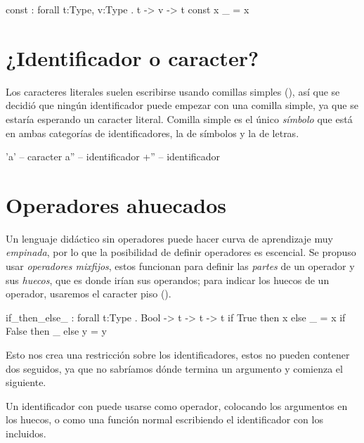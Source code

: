 {\begin{designfr}
\begin{anglercode}
const : forall t:Type, v:Type . t -> v -> t
const x _ = x
\end{anglercode}
\end{designfr}

\section{¿Identificador o caracter?}

\begin{designfr}
Los caracteres literales suelen escribirse usando comillas simples (), así que se decidió que ningún identificador puede empezar con una comilla simple, ya que se estaría esperando un caracter literal. Comilla simple es el único \emph{símbolo} que está en ambas categorías de identificadores, la de símbolos y la de letras.

\begin{anglercode}
'a'     -- caracter
a''     -- identificador
+''     -- identificador
\end{anglercode}
\end{designfr}

\section{Operadores ahuecados}

\begin{designfr}
Un lenguaje didáctico sin operadores puede hacer curva de aprendizaje muy \emph{empinada}, por lo que la posibilidad de definir operadores es escencial. Se propuso usar \emph{operadores mixfijos}, estos funcionan para definir las \emph{partes} de un operador y sus \emph{huecos}, que es donde irían sus operandos; para indicar los huecos de un operador, usaremos el caracter piso (\inlinecode{\_}).

\begin{anglercode}
if_then_else_ : forall t:Type . Bool -> t -> t -> t
if True  then x else _ = x
if False then _ else y = y
\end{anglercode}

Esto nos crea una restricción sobre los identificadores, estos no pueden contener dos \inlinecode{\_} seguidos, ya que no sabríamos dónde termina un argumento y comienza el siguiente.

Un identificador con \inlinecode{\_} puede usarse como operador, colocando los argumentos en los huecos, o como una función normal escribiendo el identificador con los \inlinecode{\_} incluidos.


\end{designfr}}
